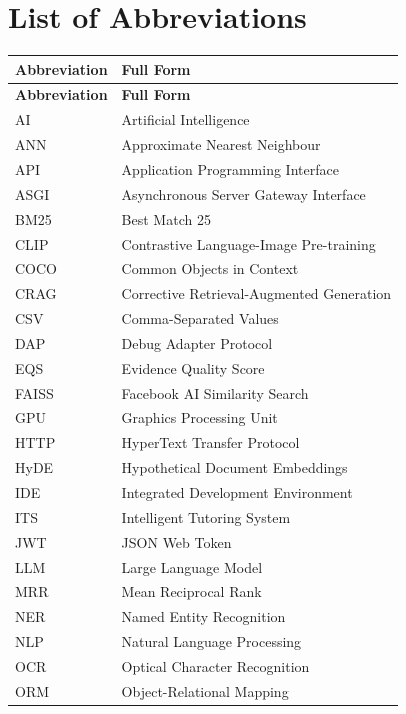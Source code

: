 \section{List of Abbreviations}
\label{sec:abbreviations}

\renewcommand{\arraystretch}{1.3}
\begin{longtable}{ll}
    \toprule
    \textbf{Abbreviation} & \textbf{Full Form} \\
    \midrule
    \endfirsthead
    \toprule
    \textbf{Abbreviation} & \textbf{Full Form} \\
    \midrule
    \endhead
    \endfoot
    \bottomrule
    \endlastfoot
    AI     & Artificial Intelligence \\
    ANN    & Approximate Nearest Neighbour \\
    API    & Application Programming Interface \\
    ASGI   & Asynchronous Server Gateway Interface \\
    BM25   & Best Match 25 \\
    CLIP   & Contrastive Language-Image Pre-training \\
    COCO   & Common Objects in Context \\
    CRAG   & Corrective Retrieval-Augmented Generation \\
    CSV    & Comma-Separated Values \\
    DAP    & Debug Adapter Protocol \\
    EQS    & Evidence Quality Score \\
    FAISS  & Facebook AI Similarity Search \\
    GPU    & Graphics Processing Unit \\
    HTTP   & HyperText Transfer Protocol \\
    HyDE   & Hypothetical Document Embeddings \\
    IDE    & Integrated Development Environment \\
    ITS    & Intelligent Tutoring System \\
    JWT    & JSON Web Token \\
    LLM    & Large Language Model \\
    MRR    & Mean Reciprocal Rank \\
    NER    & Named Entity Recognition \\
    NLP    & Natural Language Processing \\
    OCR    & Optical Character Recognition \\
    ORM    & Object-Relational Mapping \\

\end{longtable}
